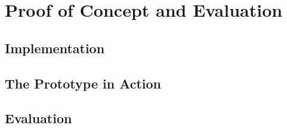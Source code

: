 \chapter{Proof of Concept and Evaluation}
\label{cap:evaluation}




\section{Implementation}
\label{sec:evaluation:implementation}





%     

%     

\section{The Prototype in Action} %


\section{Evaluation}
\label{sec:evaluation:evaluation}




